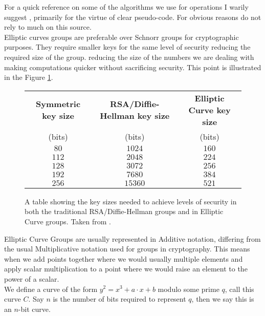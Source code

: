\documentclass[ %
                    author={Nicholas Tutte},
                supervisor={Prof. Nigel Smart},
                    degree={MEng},
                     title={Secure Two Party Computation},
                  subtitle={A practical comparison of recent protocols},
                      type={Research - GG1K},
                      year={2015} ]{dissertation}
\begin{document}
\begin{appendices}
				For a quick reference on some of the algorithms we use for operations I warily suggest \cite{Wiki_ECC}, primarily for the virtue of clear pseudo-code. For obvious reasons do not rely to much on this source.\\

				Elliptic curves groups are preferable over Schnorr groups for cryptographic purposes. They require smaller keys for the same level of security reducing the required size of the group. reducing the size of the numbers we are dealing with making computations quicker without sacrificing security. This point is illustrated in the Figure \ref{fig:NSA_ECC_Table}.\\

				\begin{figure}[!htb]
					\begin{tabular}{| c | c | c |}
						\hline
						\textbf{Symmetric key size} & \textbf{RSA/Diffie-Hellman key size} & \textbf{Elliptic Curve key size} \\
						(bits) & (bits) & (bits) \\
						\hline
						\hline
						$80$ & $1024$ & $160$ \\
						\hline
						$112$ & $2048$ & $224$ \\
						\hline
						$128$ & $3072$ & $256$ \\
						\hline
						$192$ & $7680$ & $384$ \\
						\hline
						$256$ & $15360$ & $521$ \\
						\hline
					\end{tabular}

					\caption{A table showing the key sizes needed to achieve levels of security in both the traditional RSA/Diffie-Hellman groups and in Elliptic Curve groups. Taken from \cite{NSA_CaseForECC}. \label{fig:NSA_ECC_Table}}
				\end{figure}

				Elliptic Curve Groups are usually represented in Additive notation, differing from the usual Multiplicative notation used for groups in cryptography. This means when we add points together where we would usually multiple elements and apply scalar multiplication to a point where we would raise an element to the power of a scalar.\\

				We define a curve of the form $y^2 = x^3 + a\cdot x + b$ modulo some prime $q$, call this curve $C$. Say $n$ is the number of bits required to represent $q$, then we say this is an $n$-bit curve.\\


\end{appendices}
\end{document}
